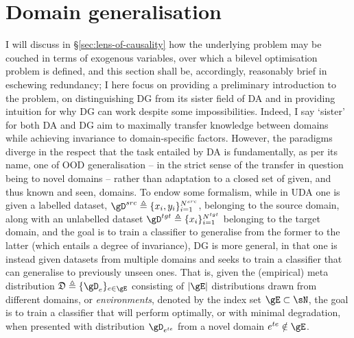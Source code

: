 \section{Domain generalisation}\label{sec:dg}
 I will discuss in \S\ref{sec:lens-of-causality} how the underlying problem may be couched in terms
 of exogenous variables, over which a bilevel optimisation problem is defined, and this section
 shall be, accordingly, reasonably brief in eschewing redundancy; I here focus on providing a
 preliminary introduction to the problem, on distinguishing \ac{DG} from its sister field of
 \ac{DA} and in providing intuition for why \ac{DG} can work despite some impossibilities.
%
Indeed, I say `sister' for both \acl{DA} and \acl{DG} aim to maximally transfer knowledge between
domains while achieving invariance to domain-specific factors. 
%
However, the paradigms diverge in the respect that the task entailed by \ac{DA} is fundamentally,
as per its name, one of \ac{OOD} generalisation -- in the strict sense of the transfer in question
being to novel domains -- rather than adaptation to a closed set of given, and thus known and seen,
domains.
%
%
To endow some formalism, while in \ac{UDA} one is given a labelled dataset, \( \gD^{src} \triangleq
\{x_i, y_i \}_{i=1}^{N^{src}} \), belonging to the source domain, along with an unlabelled dataset
\( \gD^{tgt} \triangleq \{ x_i \}_{i=1}^{N^{tgt}} \) belonging to the target domain, and the goal
is to train a classifier to generalise from the former to the latter (which entails a degree of
invariance), \ac{DG} is more general, in that one is instead given datasets from multiple domains
and seeks to train a classifier that can generalise to previously unseen ones. 
%
That is, given the (empirical) meta distribution \( \mathfrak{D} \triangleq \{\gD_e \}_{e \in \gE}
\) consisting of \( |\gE| \) distributions drawn from different domains, or \emph{environments},
denoted by the index set \( \gE \subset \sN \), the goal is to train a classifier that will perform
optimally, or with minimal degradation, when presented with distribution \( \gD_{e^{te}} \) from a
novel domain \( e^{te} \notin  \gE \).

